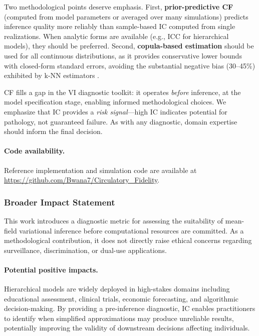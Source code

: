 \documentclass[10pt]{article} %
\theoremstyle{plain}
\theoremstyle{definition}
\begin{document}
Two methodological points deserve emphasis. First, \textbf{prior-predictive CF} (computed from model parameters or averaged over many simulations) predicts inference quality more reliably than sample-based IC computed from single realizations. When analytic forms are available (e.g., ICC for hierarchical models), they should be preferred. Second, \textbf{copula-based estimation} should be used for all continuous distributions, as it provides conservative lower bounds with closed-form standard errors, avoiding the substantial negative bias (30--45\%) exhibited by k-NN estimators \citep{vandenberg2025linfoot}.

CF fills a gap in the VI diagnostic toolkit: it operates \emph{before} inference, at the model specification stage, enabling informed methodological choices. We emphasize that IC provides a \emph{risk signal}---high IC indicates potential for pathology, not guaranteed failure. As with any diagnostic, domain expertise should inform the final decision.

\paragraph{Code availability.} Reference implementation and simulation code are available at \url{https://github.com/Bwana7/Circulatory_Fidelity}.
\subsubsection*{Broader Impact Statement}

This work introduces a diagnostic metric for assessing the suitability of mean-field variational inference before computational resources are committed. As a methodological contribution, it does not directly raise ethical concerns regarding surveillance, discrimination, or dual-use applications.

\paragraph{Potential positive impacts.} Hierarchical models are widely deployed in high-stakes domains including educational assessment, clinical trials, economic forecasting, and algorithmic decision-making. By providing a pre-inference diagnostic, IC enables practitioners to identify when simplified approximations may produce unreliable results, potentially improving the validity of downstream decisions affecting individuals.
\end{document}
